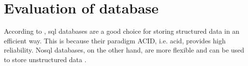 \section{Evaluation of database}\label{subsec:evaluation-db}

According to \cite{flask_book2018}, \ac{sql} databases are a good choice for storing structured data in an efficient way.
This is because their paradigm \acs{ACID}, i.e. \acl{acid}, provides high reliability.
No\ac{sql} databases, on the other hand, are more flexible and can be used to store unstructured data \cite{flask_book2018}.